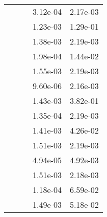 \begin{table}
\begin{tabular}{c|cc|cc|}
\multicolumn{1}{|c|}{} & \multicolumn{1}{|c|}{} & \multicolumn{1}{|c|}{} & \multicolumn{1}{|c|}{  3.12e-04} & \multicolumn{1}{|c|}{  2.17e-03} \\ 
\multicolumn{1}{|c|}{} & \multicolumn{1}{|c|}{} & \multicolumn{1}{|c|}{} & \multicolumn{1}{|c|}{  1.23e-03} & \multicolumn{1}{|c|}{  1.29e-01} \\ 
\multicolumn{1}{|c|}{} & \multicolumn{1}{|c|}{} & \multicolumn{1}{|c|}{} & \multicolumn{1}{|c|}{  1.38e-03} & \multicolumn{1}{|c|}{  2.19e-03} \\ 
\multicolumn{1}{|c|}{} & \multicolumn{1}{|c|}{} & \multicolumn{1}{|c|}{} & \multicolumn{1}{|c|}{  1.98e-04} & \multicolumn{1}{|c|}{  1.44e-02} \\ 
\multicolumn{1}{|c|}{} & \multicolumn{1}{|c|}{} & \multicolumn{1}{|c|}{} & \multicolumn{1}{|c|}{  1.55e-03} & \multicolumn{1}{|c|}{  2.19e-03} \\ 
\multicolumn{1}{|c|}{} & \multicolumn{1}{|c|}{} & \multicolumn{1}{|c|}{} & \multicolumn{1}{|c|}{  9.60e-06} & \multicolumn{1}{|c|}{  2.16e-03} \\ 
\multicolumn{1}{|c|}{} & \multicolumn{1}{|c|}{} & \multicolumn{1}{|c|}{} & \multicolumn{1}{|c|}{  1.43e-03} & \multicolumn{1}{|c|}{  3.82e-01} \\ 
\multicolumn{1}{|c|}{} & \multicolumn{1}{|c|}{} & \multicolumn{1}{|c|}{} & \multicolumn{1}{|c|}{  1.35e-04} & \multicolumn{1}{|c|}{  2.19e-03} \\ 
\multicolumn{1}{|c|}{} & \multicolumn{1}{|c|}{} & \multicolumn{1}{|c|}{} & \multicolumn{1}{|c|}{  1.41e-03} & \multicolumn{1}{|c|}{  4.26e-02} \\ 
\multicolumn{1}{|c|}{} & \multicolumn{1}{|c|}{} & \multicolumn{1}{|c|}{} & \multicolumn{1}{|c|}{  1.51e-03} & \multicolumn{1}{|c|}{  2.19e-03} \\ 
\multicolumn{1}{|c|}{} & \multicolumn{1}{|c|}{} & \multicolumn{1}{|c|}{} & \multicolumn{1}{|c|}{  4.94e-05} & \multicolumn{1}{|c|}{  4.92e-03} \\ 
\multicolumn{1}{|c|}{} & \multicolumn{1}{|c|}{} & \multicolumn{1}{|c|}{} & \multicolumn{1}{|c|}{  1.51e-03} & \multicolumn{1}{|c|}{  2.18e-03} \\ 
\multicolumn{1}{|c|}{} & \multicolumn{1}{|c|}{} & \multicolumn{1}{|c|}{} & \multicolumn{1}{|c|}{  1.18e-04} & \multicolumn{1}{|c|}{  6.59e-02} \\ 
\multicolumn{1}{|c|}{} & \multicolumn{1}{|c|}{} & \multicolumn{1}{|c|}{} & \multicolumn{1}{|c|}{  1.49e-03} & \multicolumn{1}{|c|}{  5.18e-02} \\ 

\end{tabular}
\end{table}
